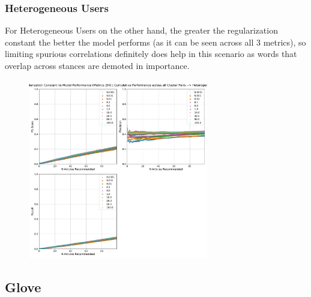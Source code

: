 \documentclass[a4paper,fontsize=8.0pt]{scrartcl}
\begin{document}
\subsubsection{Heterogeneous Users}
\begin{flushleft}
For Heterogeneous Users on the other hand, the greater the regularization constant the better the model performs (as it can be seen across all 3 metrics), so limiting spurious correlations definitely does help in this scenario as words that overlap across stances are demoted in importance. 
\end{flushleft}
\vspace{-18ex}
\begin{figure}[H]
 \includegraphics[width=0.7\textwidth]{Graphs/TFIDF/regularization_vs_model_performance_cumu_Heterogeneous.pdf}
\end{figure}
\subsection{Glove}
\end{document}
